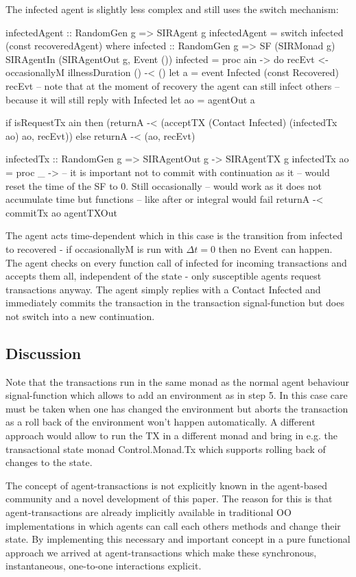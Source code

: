 The infected agent is slightly less complex and still uses the switch mechanism:
\begin{HaskellCode}
infectedAgent :: RandomGen g => SIRAgent g
infectedAgent = switch infected (const recoveredAgent)
  where
    infected :: RandomGen g => SF (SIRMonad g) SIRAgentIn (SIRAgentOut g, Event ())
    infected = proc ain -> do
      recEvt <- occasionallyM illnessDuration () -< ()
      let a = event Infected (const Recovered) recEvt
      -- note that at the moment of recovery the agent can still infect others
      -- because it will still reply with Infected
      let ao = agentOut a

      if isRequestTx ain 
        then (returnA -< (acceptTX 
                           (Contact Infected)
                           (infectedTx ao)
                           ao, recEvt))
        else returnA -< (ao, recEvt)

    infectedTx :: RandomGen g => SIRAgentOut g -> SIRAgentTX g
    infectedTx ao = proc _ ->
      -- it is important not to commit with continuation as it
      -- would reset the time of the SF to 0. Still occasionally
      -- would work as it does not accumulate time but functions
      -- like after or integral would fail
      returnA -< commitTx ao agentTXOut
\end{HaskellCode}

The agent acts time-dependent which in this case is the transition from infected to recovered - if occasionallyM is run with $\Delta t = 0$ then no Event can happen. The agent checks on every function call of infected for incoming transactions and accepts them all, independent of the state - only susceptible agents request transactions anyway. The agent simply replies with a Contact Infected and immediately commits the transaction in the transaction signal-function but does not switch into a new continuation.

\subsection{Discussion}
Note that the transactions run in the same monad as the normal agent behaviour signal-function which allows to add an environment as in step 5. In this case care must be taken when one has changed the environment but aborts the transaction as a roll back of the environment won't happen automatically. A different approach would allow to run the TX in a different monad and bring in e.g. the  transactional state monad Control.Monad.Tx which supports rolling back of changes to the state.

The concept of agent-transactions is not explicitly known in the agent-based community and a novel development of this paper. The reason for this is that agent-transactions are already implicitly available in traditional OO implementations in which agents can call each others methods and change their state. By implementing this necessary and important concept in a pure functional approach we arrived at agent-transactions which make these synchronous, instantaneous, one-to-one interactions explicit.